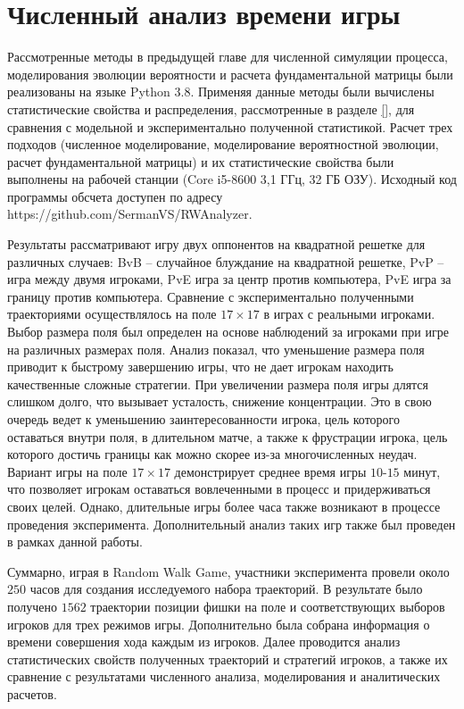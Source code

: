 \chapter{Численный анализ времени игры}\label{ch:ch3}

Рассмотренные методы в предыдущей главе для численной симуляции процесса,
моделирования эволюции вероятности и расчета фундаментальной матрицы 
были реализованы на языке Python 3.8. 
Применяя данные методы были вычислены статистические свойства и распределения, 
рассмотренные в разделе \cref{}, для сравнения с модельной и экспериментально полученной статистикой. 
Расчет трех подходов (численное моделирование, моделирование вероятностной эволюции, расчет фундаментальной матрицы) 
и их статистические свойства были выполнены на рабочей станции (Core i5-8600 3,1 ГГц, 32 ГБ ОЗУ). 
Исходный код программы обсчета доступен по адресу https://github.com/SermanVS/RWAnalyzer.

Результаты рассматривают игру двух оппонентов на квадратной решетке для различных случаев:
BvB -- случайное блуждание на квадратной решетке, PvP -- игра между двумя игроками, PvE игра за центр против компьютера, PvE игра за границу против компьютера. 
Сравнение с экспериментально полученными траекториями осуществлялось на поле $17 \times 17$ в играх с 
реальными игроками. Выбор размера поля был определен на основе наблюдений за игроками при игре на различных размерах поля.
Анализ показал, что уменьшение размера поля приводит к быстрому завершению игры, что не дает игрокам находить качественные сложные
стратегии. При увеличении размера поля игры длятся слишком долго, что вызывает усталость, снижение концентрации.
Это в свою очередь ведет к уменьшению заинтересованности игрока, цель которого оставаться внутри поля, в длительном матче,
а также к фрустрации игрока, цель которого достичь границы как можно скорее из-за многочисленных неудач.
Вариант игры на поле $17 \times 17$ демонстрирует среднее время игры $10$-$15$ минут, что позволяет игрокам оставаться вовлеченными
в процесс и придерживаться своих целей. Однако, длительные игры более часа также возникают в процессе проведения эксперимента.
Дополнительный анализ таких игр также был проведен в рамках данной работы.

Суммарно, играя в Random Walk Game, участники эксперимента провели около $250$ часов для создания исследуемого набора траекторий.
В результате было получено $1562$ траектории позиции фишки на поле и соответствующих выборов игроков для трех режимов игры. 
Дополнительно была собрана информация о времени совершения хода каждым из игроков. 
Далее проводится анализ статистических свойств полученных траекторий и стратегий игроков, 
а также их сравнение с результатами численного анализа, моделирования и аналитических расчетов.

